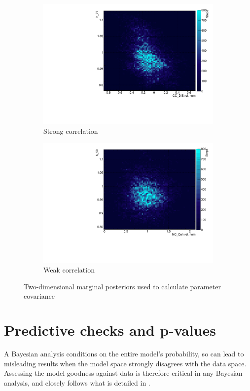\begin{figure}[h]
	\begin{subfigure}[t]{0.40\textwidth}
		\includegraphics[width=\textwidth, trim={0mm 0mm 0mm 0mm}, clip,page=1]{figures/mcmc/example_corr}
		\caption{Strong correlation}
	\end{subfigure}
	\begin{subfigure}[t]{0.40\textwidth}
		\includegraphics[width=\textwidth, trim={0mm 0mm 0mm 0mm}, clip,page=1]{figures/mcmc/example_corr2}
		\caption{Weak correlation}
	\end{subfigure}
	\caption{Two-dimensional marginal posteriors used to calculate parameter covariance}
	\label{fig:cov_2d_posterior}
\end{figure}

\section{Predictive checks and p-values}
A Bayesian analysis conditions on the entire model's probability, so can lead to misleading results when the model space strongly disagrees with the data space. Assessing the model goodness against data is therefore critical in any Bayesian analysis, and closely follows what is detailed in \cite{posterior_predictive_checks, posterior_predictive_checks2, posterior_predictive_checks3, prior_predictive_checks}. 

